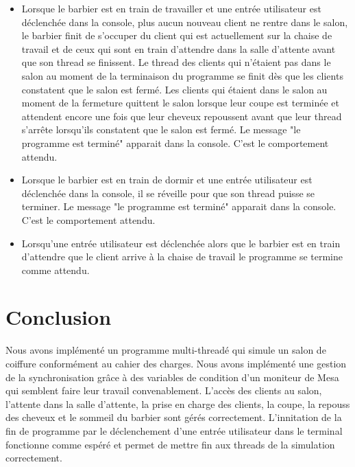 \documentclass{article}
\begin{document}
\begin{itemize}
    \item Lorsque le barbier est en train de travailler et une entrée utilisateur est déclenchée dans la console, plus aucun nouveau client
    ne rentre dans le salon, le barbier finit de s'occuper du client qui est actuellement sur la chaise de travail et de ceux qui sont
    en train d'attendre dans la salle d'attente avant que son thread se finissent. Le thread des clients qui n'étaient pas dans le salon au 
    moment de la terminaison du programme se finit dès que les clients constatent que le salon est fermé. Les clients qui étaient dans le
    salon au moment de la fermeture quittent le salon lorsque leur coupe est terminée et attendent encore une fois que leur cheveux repoussent
    avant que leur thread s'arrête lorsqu'ils constatent que le salon est fermé. Le message "le programme est terminé" apparait dans la console.
    C'est le comportement attendu.
    \item Lorsque le barbier est en train de dormir et une entrée utilisateur est déclenchée dans la console, il se réveille pour que son
    thread puisse se terminer. Le message "le programme est terminé" apparait dans la console. C'est le comportement attendu.
    \item Lorsqu'une entrée utilisateur est déclenchée alors que le barbier est en train d'attendre que le client arrive à la chaise de travail
    le programme se termine comme attendu. 
\end{itemize}

\section*{Conclusion}

Nous avons implémenté un programme multi-threadé qui simule un salon de coiffure conformément au cahier des charges. Nous avons implémenté une
gestion de la synchronisation grâce à des variables de condition d'un moniteur de Mesa qui semblent faire leur travail convenablement. 
L'accès des clients au salon, l'attente dans la salle d'attente, la prise en charge des clients, la coupe, la repouss des cheveux et le 
sommeil du barbier sont gérés correctement.
L'innitation de la fin de programme par le déclenchement d'une entrée utilisateur dans le terminal fonctionne comme espéré et permet de 
mettre fin aux threads de la simulation correctement.
\end{document}
